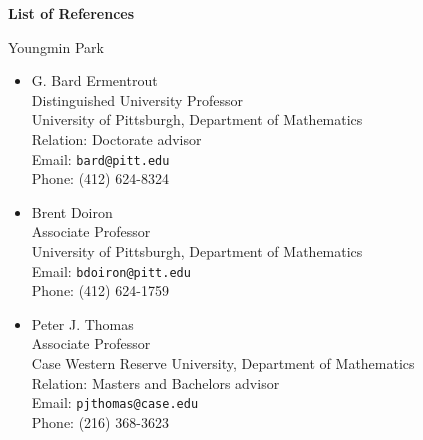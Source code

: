 \documentclass[a4paper,11pt]{article}
\begin{document}
\begin{center}
\Large \textbf{List of References}

\Large Youngmin Park
\end{center}

\begin{itemize}
 \item G. Bard Ermentrout\\
 Distinguished University Professor\\
 University of Pittsburgh, Department of Mathematics\\
 Relation: Doctorate advisor\\
 Email: \texttt{bard@pitt.edu}\\
 Phone: (412) 624-8324
 \item Brent Doiron\\
 Associate Professor\\
 University of Pittsburgh, Department of Mathematics\\
 Email: \texttt{bdoiron@pitt.edu}\\
 Phone: (412) 624-1759
 \item Peter J. Thomas\\
 Associate Professor\\
 Case Western Reserve University, Department of Mathematics\\
 Relation: Masters and Bachelors advisor\\
 Email: \texttt{pjthomas@case.edu}\\
 Phone: (216) 368-3623
\end{itemize}
\end{document}

